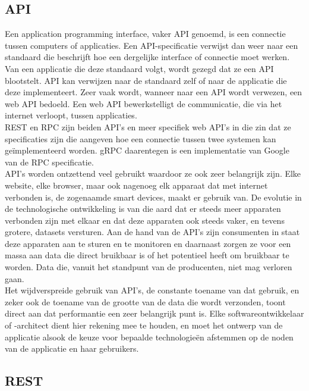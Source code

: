 \subsection{API}

Een application programming interface, vaker API genoemd, is een connectie tussen computers of applicaties.
Een API-specificatie verwijst dan weer naar een standaard die beschrijft hoe een dergelijke interface of connectie moet werken.
Van een applicatie die deze standaard volgt, wordt gezegd dat ze een API blootstelt. API kan verwijzen naar de standaard zelf of naar de applicatie die deze implementeert.
Zeer vaak wordt, wanneer naar een API wordt verwezen, een web API bedoeld. Een web API bewerkstelligt de communicatie, die via het internet verloopt, tussen applicaties.\\

REST en RPC zijn beiden API's en meer specifiek web API's in die zin dat ze specificaties zijn die aangeven hoe een connectie tussen twee systemen kan geïmplementeerd worden.
gRPC daarentegen is een implementatie van Google van de RPC specificatie.\\

API's worden ontzettend veel gebruikt waardoor ze ook zeer belangrijk zijn. Elke website, elke browser, maar ook nagenoeg elk apparaat dat met internet verbonden is,
de zogenaamde smart devices, maakt er gebruik van. De evolutie in de technologische ontwikkeling is van die aard dat er steeds meer apparaten verbonden zijn met elkaar
en dat deze apparaten ook steeds vaker, en tevens grotere, datasets versturen. Aan de hand van de API's zijn consumenten in staat deze apparaten aan te sturen en te monitoren
en daarnaast zorgen ze voor een massa aan data die direct bruikbaar is of het potentieel heeft om bruikbaar te worden. Data die, vanuit het standpunt van de producenten, niet mag verloren gaan.\\

Het wijdverspreide gebruik van API's, de constante toename van dat gebruik, en zeker ook de toename van de grootte van de data die wordt verzonden, toont
direct aan dat performantie een zeer belangrijk punt is. Elke softwareontwikkelaar of -architect dient hier rekening mee te houden, en moet het ontwerp van de
applicatie alsook de keuze voor bepaalde technologieën afstemmen op de noden van de applicatie en haar gebruikers.
~\autocite{cleo}

\subsection{REST}

